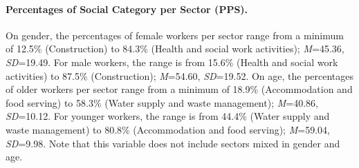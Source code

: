 \documentclass[man]{apa7}
\begin{document}
\paragraph{Percentages of Social Category per Sector (PPS).}
\label{ivs_pps}
On gender, the percentages of female workers per sector range from a minimum of 12.5\% (Construction) to 84.3\% (Health and social work activities); \textit{M}=45.36, \textit{SD}=19.49. For male workers, the range is from 15.6\% (Health and social work activities) to 87.5\% (Construction); \textit{M}=54.60, \textit{SD}=19.52. On age, the percentages of older workers per sector range from a minimum of 18.9\% (Accommodation and food serving) to 58.3\% (Water supply and waste management); \textit{M}=40.86, \textit{SD}=10.12. For younger workers, the range is from 44.4\% (Water supply and waste management) to 80.8\% (Accommodation and food serving); \textit{M}=59.04, \textit{SD}=9.98. Note that this variable does not include sectors mixed in gender and age.
\end{document}
